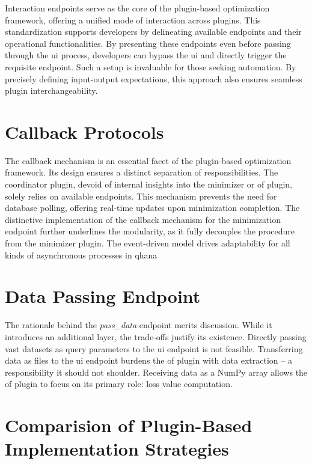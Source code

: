 \documentclass[
  a4paper,  %
  twoside,  %
  bibliography=totoc,
  headsepline,
  cleardoublepage=empty,
  parskip=half,
  draft=false
]{scrbook}
\begin{document}
Interaction endpoints serve as the core of the plugin-based optimization framework, offering a unified mode of interaction across plugins.
This standardization supports developers by delineating available endpoints and their operational functionalities.
By presenting these endpoints even before passing through the \gls{ui} process, developers can bypass the \gls{ui} and directly trigger the requisite endpoint.
Such a setup is invaluable for those seeking automation.
By precisely defining input-output expectations, this approach also ensures seamless plugin interchangeability.

\section{Callback Protocols}
\label{sec:callackMechanism}

The callback mechanism is an essential facet of the plugin-based optimization framework.
Its design ensures a distinct separation of responsibilities.
The coordinator plugin, devoid of internal insights into the minimizer or \gls{of} plugin, solely relies on available endpoints.
This mechanism prevents the need for database polling, offering real-time updates upon minimization completion.
The distinctive implementation of the callback mechanism for the minimization endpoint further underlines the modularity, as it fully decouples the procedure from the minimizer plugin.
The event-driven model drives adaptability for all kinds of asynchronous processes in \gls{qhana}

\section{Data Passing Endpoint}
\label{sec:passDataEndpoint}

The rationale behind the \emph{pass\_data} endpoint merits discussion.
While it introduces an additional layer, the trade-offs justify its existence.
Directly passing vast datasets as query parameters to the \gls{ui} endpoint is not feasible.
Transferring data as files to the \gls{ui} endpoint burdens the \gls{of} plugin with data extraction – a responsibility it should not shoulder.
Receiving data as a NumPy array allows the \gls{of} plugin to focus on its primary role: loss value computation.

\section{Comparision of Plugin-Based Implementation Strategies}
\label{sec:differencesBetweenTheTwoPluginBasedImplementationApproaches}
\end{document}
